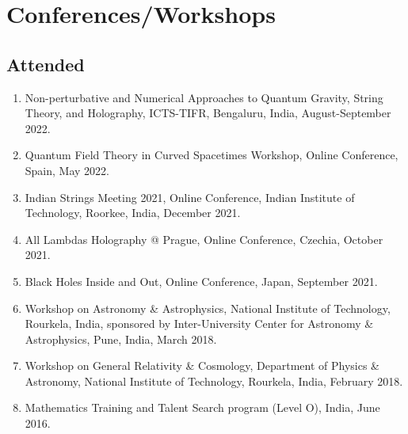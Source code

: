 \documentclass[11pt, letterpaper]{article}
\begin{document}
	\section{Conferences/Workshops}
	\subsection{Attended}
	\begin{enumerate}
		\item Non-perturbative and Numerical Approaches to Quantum Gravity, String Theory, and Holography, ICTS-TIFR, Bengaluru, India, August-September 2022.

		\item Quantum Field Theory in Curved Spacetimes Workshop, Online Conference, Spain, May 2022.

		\item Indian Strings Meeting 2021, Online Conference, Indian Institute of Technology, Roorkee, India, December 2021.

		\item All Lambdas Holography @ Prague, Online Conference, Czechia, October 2021.

		\item Black Holes Inside and Out, Online Conference, Japan, September 2021.
		
		\item Workshop on Astronomy \& Astrophysics, National Institute of Technology, Rourkela, India, sponsored by Inter-University Center for Astronomy \& Astrophysics, Pune, India, March 2018.

		\item Workshop on General Relativity \& Cosmology, Department of Physics \& Astronomy, National Institute of Technology, Rourkela, India, February 2018.
		
		\item Mathematics Training and Talent Search program (Level O), India, June 2016.
	\end{enumerate}
	
\end{document}
